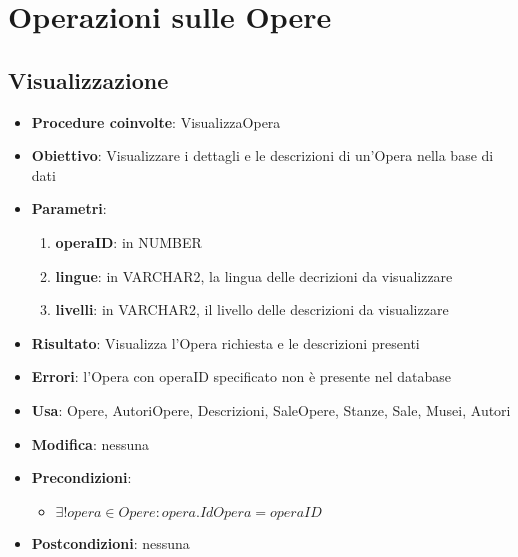 \section{Operazioni sulle Opere}

\subsection{Visualizzazione}
\begin{itemize}
	\item \textbf{Procedure coinvolte}: VisualizzaOpera
	\item \textbf{Obiettivo}: Visualizzare i dettagli e le descrizioni di un'Opera nella base di dati
	\item \textbf{Parametri}:
	\begin{enumerate}
		\item \textbf{operaID}: in NUMBER
		\item \textbf{lingue}: in VARCHAR2, la lingua delle decrizioni da visualizzare
		\item \textbf{livelli}: in VARCHAR2, il livello delle descrizioni da visualizzare
	\end{enumerate}
	\item \textbf{Risultato}: Visualizza l'Opera richiesta e le descrizioni presenti
	\item \textbf{Errori}: l'Opera con operaID specificato non è presente nel database
	\item \textbf{Usa}: Opere, AutoriOpere, Descrizioni, SaleOpere, Stanze, Sale, Musei, Autori
	\item \textbf{Modifica}: nessuna
	\item \textbf{Precondizioni}:
	\begin{itemize}
		\item $\exists! opera \in Opere : opera.IdOpera = operaID$
	\end{itemize}
	\item \textbf{Postcondizioni}: nessuna
\end{itemize}

